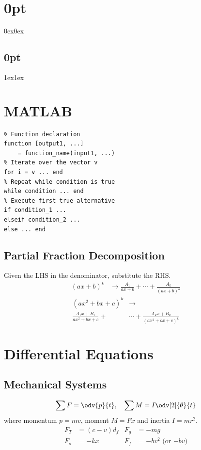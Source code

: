 \documentclass{article}
\begin{document}
\titlespacing*\section{0pt}{0ex}{0ex}
\titlespacing*\subsection{0pt}{1ex}{1ex}
%
\setlength{\abovecaptionskip}{-5pt}
\setlength{\textfloatsep}{0pt}
%
\setlength{\abovedisplayskip}{1pt}
\setlength{\belowdisplayskip}{1pt}
%
\lstset{language=Matlab, upquote=true}
%
\begin{multicols}{3}
    \section*{MATLAB}
    \lstset{belowskip=0pt, aboveskip=0pt}
    \begin{lstlisting}
% Function declaration
function [output1, ...]
    = function_name(input1, ...)
% Iterate over the vector v
for i = v ... end 
% Repeat while condition is true
while condition ... end
% Execute first true alternative
if condition_1 ...
elseif condition_2 ... 
else ... end
\end{lstlisting}
    \subsection*{Partial Fraction Decomposition}
    Given the LHS in the denominator, substitute the RHS\@.
    \begin{align*}
        \left(ax+b\right)^k & \to \frac{A_1}{ax+b} + \cdots + \frac{A_k}{\left( ax+b \right)^k}
    \end{align*}
    \begin{align*}
        \left(ax^2+bx+c\right)^k     & \to                                                  \\
        \frac{A_1x+B_1}{ax^2+bx+c} + & \cdots + \frac{A_k x+B_k}{\left( ax^2+bx+c \right)^k}
    \end{align*}
    \section*{Differential Equations}
    \subsection*{Mechanical Systems}
    \begin{equation*}
        \sum F = \odv{p}{t},\quad \sum M = I \odv[2]{\theta}{t}
    \end{equation*}
    where momentum \(p = mv\), moment \(M=Fx\) and inertia \(I=mr^2\).
    \begin{align*}
        F_T & = \left( c - v \right) d_f & F_g & = -mg                       \\
        F_s & = -kx                      & F_f & = -b v^2 \text{ (or \(-bv\))}
    \end{align*}

\end{multicols}
\end{document}
